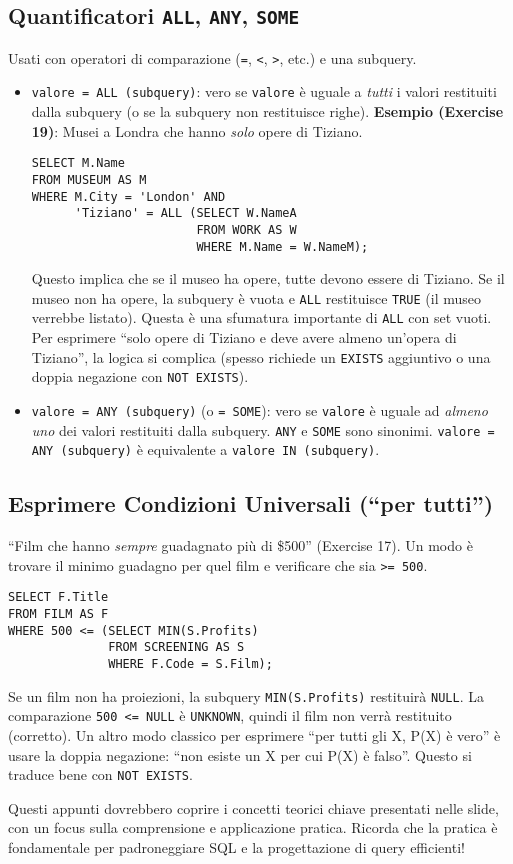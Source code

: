 \subsection{Quantificatori \texttt{ALL}, \texttt{ANY}, \texttt{SOME}}
Usati con operatori di comparazione (\texttt{=}, \texttt{<}, \texttt{>}, etc.) e una subquery.
\begin{itemize}
    \item \texttt{valore = ALL (subquery)}: vero se \texttt{valore} è uguale a \textit{tutti} i valori restituiti dalla subquery (o se la subquery non restituisce righe).
    \textbf{Esempio (Exercise 19)}: Musei a Londra che hanno \textit{solo} opere di Tiziano.
    \begin{verbatim}
SELECT M.Name
FROM MUSEUM AS M
WHERE M.City = 'London' AND
      'Tiziano' = ALL (SELECT W.NameA
                       FROM WORK AS W
                       WHERE M.Name = W.NameM);
    \end{verbatim}
    Questo implica che se il museo ha opere, tutte devono essere di Tiziano. Se il museo non ha opere, la subquery è vuota e \texttt{ALL} restituisce \texttt{TRUE} (il museo verrebbe listato). Questa è una sfumatura importante di \texttt{ALL} con set vuoti. Per esprimere ``solo opere di Tiziano e deve avere almeno un'opera di Tiziano'', la logica si complica (spesso richiede un \texttt{EXISTS} aggiuntivo o una doppia negazione con \texttt{NOT EXISTS}).

    \item \texttt{valore = ANY (subquery)} (o \texttt{= SOME}): vero se \texttt{valore} è uguale ad \textit{almeno uno} dei valori restituiti dalla subquery. \texttt{ANY} e \texttt{SOME} sono sinonimi. \texttt{valore = ANY (subquery)} è equivalente a \texttt{valore IN (subquery)}.
\end{itemize}

\subsection{Esprimere Condizioni Universali (``per tutti'')}
``Film che hanno \textit{sempre} guadagnato più di \$500'' (Exercise 17).
Un modo è trovare il minimo guadagno per quel film e verificare che sia \texttt{>= 500}.
\begin{verbatim}
SELECT F.Title
FROM FILM AS F
WHERE 500 <= (SELECT MIN(S.Profits)
              FROM SCREENING AS S
              WHERE F.Code = S.Film);
\end{verbatim}
Se un film non ha proiezioni, la subquery \texttt{MIN(S.Profits)} restituirà \texttt{NULL}. La comparazione \texttt{500 <= NULL} è \texttt{UNKNOWN}, quindi il film non verrà restituito (corretto).
Un altro modo classico per esprimere ``per tutti gli X, P(X) è vero'' è usare la doppia negazione: ``non esiste un X per cui P(X) è falso''. Questo si traduce bene con \texttt{NOT EXISTS}.

\vspace{1cm}
Questi appunti dovrebbero coprire i concetti teorici chiave presentati nelle slide, con un focus sulla comprensione e applicazione pratica. Ricorda che la pratica è fondamentale per padroneggiare SQL e la progettazione di query efficienti!

